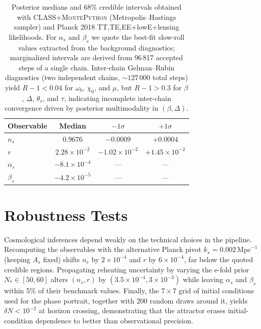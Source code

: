 \documentclass[11pt,a4paper]{article}
\begin{document}
\begin{table}[t]
    \centering
    \caption{Posterior medians and 68\% credible intervals obtained with \textsc{CLASS}+\textsc{MontePython} (Metropolis--Hastings sampler) and Planck 2018 TT,TE,EE+lowE+lensing likelihoods. For $\alpha_{s}$ and $\beta_{s}$ we quote the best-fit slow-roll values extracted from the background diagnostics; marginalized intervals are derived from 96\,817 accepted steps of a single chain. Inter-chain Gelman--Rubin diagnostics (two independent chains, ${\sim}127\,000$ total steps) yield $R{-}1<0.04$ for $\omega_b$, $\chi_0$, and $\mu$, but $R{-}1>0.3$ for $\beta$, $\Delta$, $\theta_s$, and $\tau$, indicating incomplete inter-chain convergence driven by posterior multimodality in $(\beta,\Delta)$.}
    \begin{tabular}{lccc}
        \toprule
        Observable & Median & $-1\sigma$ & $+1\sigma$ \\
        \midrule
        $n_{s}$ & $0.9676$ & $-0.0009$ & $+0.0004$ \\
        $r$ & $2.28\times10^{-2}$ & $-1.02\times10^{-2}$ & $+1.45\times10^{-2}$ \\
        $\alpha_{s}$ & $-8.1\times10^{-4}$ & --- & --- \\
        $\beta_{s}$ & $-4.2\times10^{-5}$ & --- & --- \\
        \bottomrule
    \end{tabular}
    \label{tab:observables}
\end{table}

\section{Robustness Tests}
\label{sec:robustness}
Cosmological inferences depend weakly on the technical choices in the pipeline. Recomputing the observables with the alternative Planck pivot $k_{\star}=0.002\,\mathrm{Mpc}^{-1}$ (keeping $A_{s}$ fixed) shifts $n_{s}$ by $2\times10^{-4}$ and $r$ by $6\times10^{-4}$, far below the quoted credible regions. Propagating reheating uncertainty by varying the e-fold prior $N_{*}\in[50,60]$ alters $(n_{s},r)$ by $(3.5\times10^{-4},3\times10^{-3})$ while leaving $\alpha_{s}$ and $\beta_{s}$ within 5\% of their benchmark values. Finally, the $7\times7$ grid of initial conditions used for the phase portrait, together with 200 random draws around it, yields $\delta N<10^{-2}$ at horizon crossing, demonstrating that the attractor erases initial-condition dependence to better than observational precision.
\end{document}
